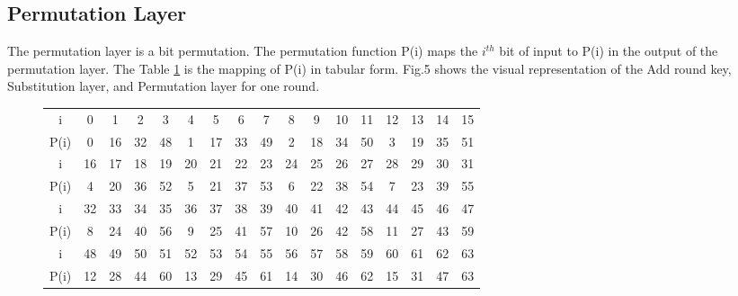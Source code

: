 \documentclass[preprint]{transcrypto}
\begin{document}
\subsection{Permutation Layer} 
The permutation layer is a bit permutation. The permutation function P(i) maps the $i^{th}$ bit of input to P(i) in the output of the permutation layer. The Table {\ref{pLayer}} is the mapping of P(i) in tabular form. Fig.5 shows the visual representation of the Add round key, Substitution layer, and Permutation layer for one round.
\begin{figure}[h!]
    \centering
    \begin{tabular}{ |c||c|c|c|c|c|c|c|c|c|c|c|c|c|c|c|c| }
        \hline
        i& 0 &1 &2 &3& 4& 5& 6 &7 &8 &9 &10 &11 &12 &13 &14 &15 \\
        P(i) &0& 16& 32& 48& 1& 17& 33&49& 2 &18& 34& 50& 3 &19 &35 &51 \\\hline\hline
        i &16& 17& 18& 19& 20& 21 &22& 23 &24 &25 &26 &27 &28 &29 &30 &31 \\
        P(i)& 4 &20 &36& 52& 5& 21 &37& 53& 6 &22& 38& 54& 7 &23 &39 &55 \\\hline\hline
        i &32& 33& 34& 35& 36& 37 &38& 39 &40 &41 &42 &43 &44 &45 &46 &47 \\
        P(i) &8 &24& 40& 56 &9& 25 &41 &57 &10 &26 &42 &58 &11 &27 &43 &59 \\\hline\hline
        i &48& 49& 50 &51 &52 &53& 54& 55 &56 &57 &58 &59 &60 &61 &62 &63 \\
        P(i) &12& 28& 44&60& 13 &29& 45& 61 &14 &30 &46 &62 &15 &31 &47 &63 \\\hline
    \end{tabular}
    \label{pLayer}
\end{figure}
\end{document}
